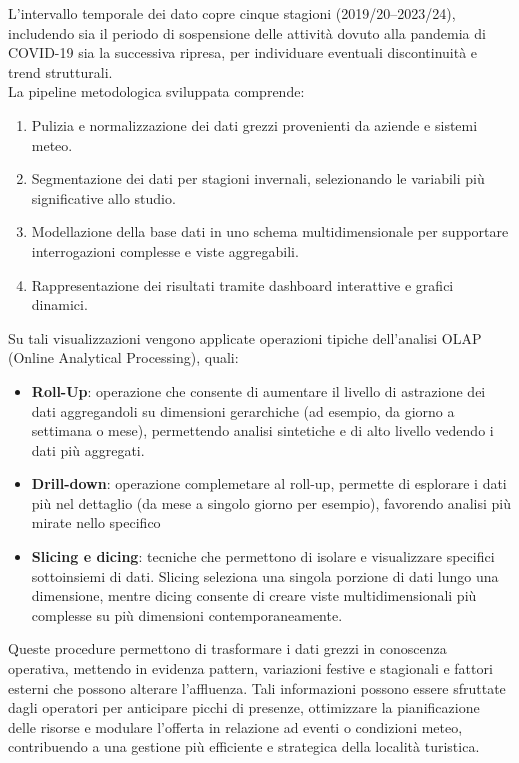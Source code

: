 L’intervallo temporale dei dato copre cinque stagioni (2019/20–2023/24), includendo sia il periodo di sospensione delle attività dovuto alla pandemia di COVID-19 sia la successiva ripresa, per individuare eventuali discontinuità e trend strutturali.\\

La pipeline metodologica sviluppata comprende:

\begin{enumerate}
    \item Pulizia e normalizzazione dei dati grezzi provenienti da aziende e sistemi meteo.
    \item Segmentazione dei dati per stagioni invernali, selezionando le variabili più significative allo studio.
    \item Modellazione della base dati in uno schema multidimensionale per supportare interrogazioni complesse e viste aggregabili.
    \item Rappresentazione dei risultati tramite dashboard interattive e grafici dinamici.
\end{enumerate}

 Su tali visualizzazioni vengono applicate operazioni tipiche dell’analisi OLAP (Online Analytical Processing), quali:

\begin{itemize}
    \item \textbf{Roll-Up}: operazione che consente di aumentare il livello di astrazione dei dati aggregandoli su dimensioni gerarchiche (ad esempio, da giorno a settimana o mese), permettendo analisi sintetiche e di alto livello vedendo i dati più aggregati.
    \item \textbf{Drill-down}: operazione complemetare al roll-up, permette di esplorare i dati più nel dettaglio (da mese a singolo giorno per esempio), favorendo analisi più mirate nello specifico
    \item \textbf{Slicing e dicing}: tecniche che permettono di isolare e visualizzare specifici sottoinsiemi di dati. Slicing seleziona una singola porzione di dati lungo una dimensione, mentre dicing consente di creare viste multidimensionali più complesse su più dimensioni contemporaneamente.
\end{itemize}

Queste procedure permettono di trasformare i dati grezzi in conoscenza operativa, mettendo in evidenza pattern, variazioni festive e stagionali e fattori esterni che possono alterare l’affluenza. Tali informazioni possono essere sfruttate dagli operatori per anticipare picchi di presenze, ottimizzare la pianificazione delle risorse e modulare l'offerta in relazione ad eventi o condizioni meteo, contribuendo a una gestione più efficiente e strategica della località turistica.\\

